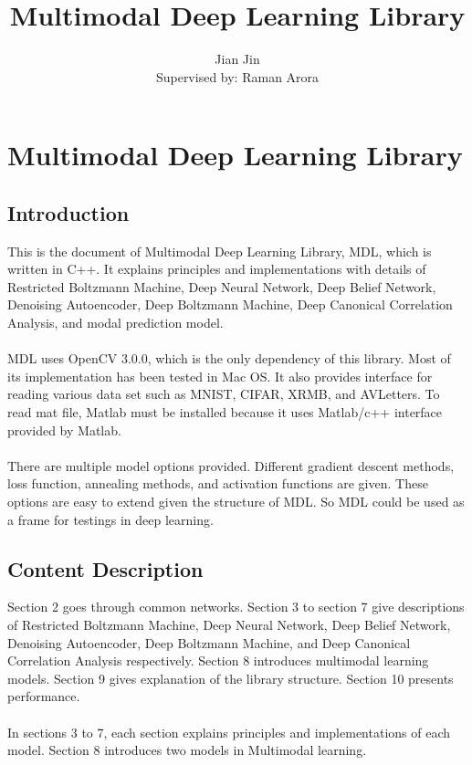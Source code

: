 \documentclass[12pt]{article}
\begin{document}
\title{\vspace{40mm}Multimodal Deep Learning Library}
\author[]{Jian Jin\\{\small Supervised by: Raman Arora}}
\maketitle
\thispagestyle{empty} 

\newpage
\tableofcontents
\newpage

\section{Multimodal Deep Learning Library}
\subsection{Introduction}
This is the document of Multimodal Deep Learning Library, MDL, which is written in C++. It explains principles and implementations with details of Restricted Boltzmann Machine, Deep Neural Network, Deep Belief Network, Denoising Autoencoder, Deep Boltzmann Machine, Deep Canonical Correlation Analysis, and modal prediction model.\\
\\
MDL uses OpenCV 3.0.0, which is the only dependency of this library. Most of its implementation has been tested in Mac OS. It also provides interface for reading various data set such as MNIST, CIFAR, XRMB, and AVLetters. To read mat file, Matlab must be installed because it uses Matlab/c++ interface provided by Matlab.\\
\\
There are multiple model options provided. Different gradient descent methods, loss function, annealing methods, and activation functions are given. These options are easy to extend given the structure of MDL. So MDL could be used as a frame for testings in deep learning.
\subsection{Content Description}
Section 2 goes through common networks. Section 3 to section 7 give descriptions of Restricted Boltzmann Machine, Deep Neural Network, Deep Belief Network, Denoising Autoencoder, Deep Boltzmann Machine, and Deep Canonical Correlation Analysis respectively. Section 8 introduces multimodal learning models. Section 9 gives explanation of the library structure. Section 10 presents performance.\\
\\
In sections 3 to 7, each section explains principles and implementations of each model. Section 8 introduces two models in Multimodal learning.
\clearpage
\end{document}
